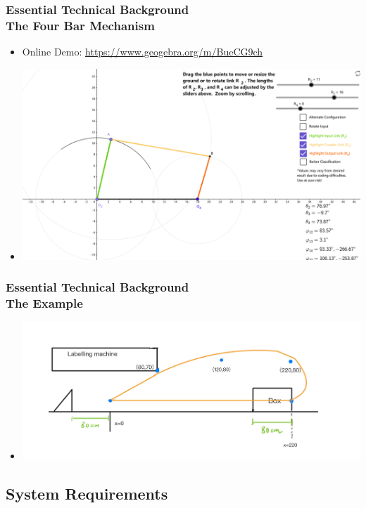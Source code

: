 \documentclass[ucs,10pt]{beamer}
\begin{document}
\begin{frame}
\frametitle{Essential Technical Background \\
    \small \color{rwth-blue} The Four Bar Mechanism}
    \begin{itemize}
        \item Online Demo: \url{https://www.geogebra.org/m/BueCG9ch}
        \item \includegraphics[width=\linewidth]{./Used_Picture/Online_Demo_1.png}
    \end{itemize}
\end{frame}


\begin{frame}
\frametitle{Essential Technical Background \\
	\small \color{rwth-blue} The Example}
	\begin{itemize}
        \item \includegraphics[width=\linewidth]{./Used_Picture/Example_1.jpg}
	\end{itemize}
\end{frame}


\subsection{System Requirements}
\end{document}
